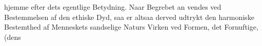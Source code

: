 \documentclass[12pt,a4paper]{book}
\begin{document}
hjemme efter dets egentlige Betydning. Naar Begrebet an\-%
vendes ved Bestemmelsen af den ethiske Dyd, saa er altsaa
derved udtrykt den harmoniske Bestemthed af Menneskets
sandselige Naturs Virken ved Formen, det Fornuftige, (dens
\end{document}
